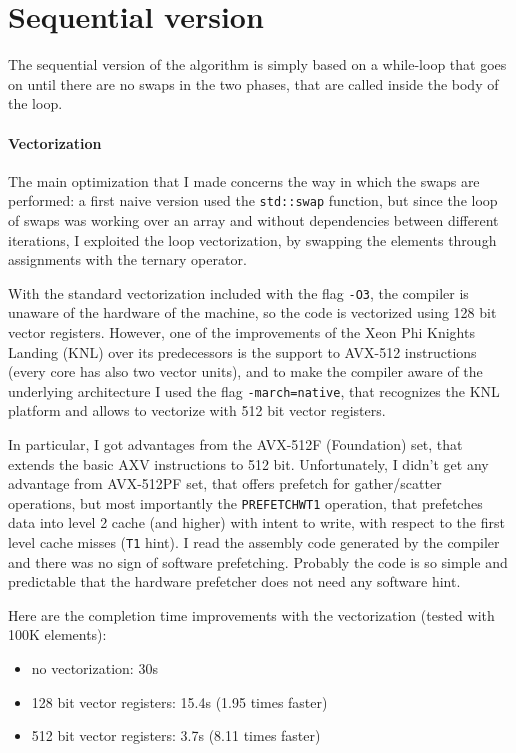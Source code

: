 \section{Sequential version}
The sequential version of the algorithm is simply based on a while-loop that goes on until there are no swaps in the two phases, that are called inside the body of the loop.

\paragraph{Vectorization}
The main optimization that I made concerns the way in which the swaps are performed: a first naive version used the \texttt{std::swap} function, but since the loop of swaps was working over an array and without dependencies between different iterations, I exploited the loop vectorization, by swapping the elements through assignments with the ternary operator.

With the standard vectorization included with the flag \texttt{-O3}, the compiler is unaware of the hardware of the machine, so the code is vectorized using 128 bit vector registers. However, one of the improvements of the Xeon Phi Knights Landing (KNL) over its predecessors is the support to AVX-512 instructions (every core has also two vector units), and to make the compiler aware of the underlying architecture I used the flag \texttt{-march=native}, that recognizes the KNL platform and allows to vectorize with 512 bit vector registers.

In particular, I got advantages from the AVX-512F (Foundation) set, that extends the basic AXV instructions to 512 bit. Unfortunately, I didn't get any advantage from AVX-512PF set, that offers prefetch for gather/scatter operations, but most importantly the \texttt{PREFETCHWT1} operation, that prefetches data into level 2 cache (and higher) with intent to write, with respect to the first level cache misses (\texttt{T1} hint). I read the assembly code generated by the compiler and there was no sign of software prefetching. Probably the code is so simple and predictable that the hardware prefetcher does not need any software hint.
\bigbreak

Here are the completion time improvements with the vectorization (tested with 100K elements):
\begin{itemize}
    \item no vectorization: 30s
    \item 128 bit vector registers: 15.4s (1.95 times faster)
    \item 512 bit vector registers: 3.7s (8.11 times faster)
\end{itemize}

